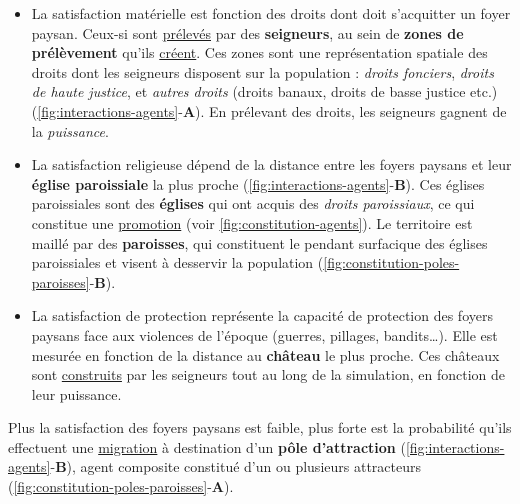 \begin{itemize}
	\item La satisfaction matérielle est fonction des droits dont doit s'acquitter un foyer paysan.
	Ceux-si sont \ul{prélevés} par des \textbf{seigneurs}, au sein de \textbf{zones de prélèvement} qu'ils \ul{créent}.
	Ces zones sont une représentation spatiale des droits dont les seigneurs disposent sur la population : \textit{droits fonciers}, \textit{droits de haute justice}, et \textit{autres droits} (droits banaux, droits de basse justice etc.) (\cref{fig:interactions-agents}-\textbf{A}).
	En prélevant des droits, les seigneurs gagnent de la \textit{puissance}.
	
	\item La satisfaction religieuse dépend de la distance entre les foyers paysans et leur \textbf{église paroissiale} la plus proche (\cref{fig:interactions-agents}-\textbf{B}).
	Ces églises paroissiales sont des \textbf{églises} qui ont acquis des \textit{droits paroissiaux}, ce qui constitue une \ul{promotion} (voir \cref{fig:constitution-agents}).
	Le territoire est maillé par des \textbf{paroisses}, qui constituent le pendant surfacique des églises paroissiales et visent à desservir la population (\cref{fig:constitution-poles-paroisses}-\textbf{B}).
	
	\item La satisfaction de protection représente la capacité de protection des foyers paysans face aux violences de l'époque (guerres, pillages, bandits\ldots).
	Elle est mesurée en fonction de la distance au \textbf{château} le plus proche.
	Ces châteaux sont \ul{construits} par les seigneurs tout au long de la simulation, en fonction de leur puissance.
\end{itemize}

\vspace{-1em}\noindent Plus la satisfaction des foyers paysans est faible, plus forte est la probabilité qu'ils effectuent une \ul{migration} à destination d'un \textbf{pôle d'attraction}  (\cref{fig:interactions-agents}-\textbf{B}), agent composite constitué d'un ou plusieurs attracteurs (\cref{fig:constitution-poles-paroisses}-\textbf{A}).

